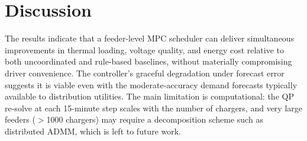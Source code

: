 \section{Discussion}
The results indicate that a feeder-level MPC scheduler can deliver simultaneous improvements
in thermal loading, voltage quality, and energy cost relative to both uncoordinated and
rule-based baselines, without materially compromising driver convenience. The controller's
graceful degradation under forecast error suggests it is viable even with the moderate-accuracy
demand forecasts typically available to distribution utilities. The main limitation is
computational: the QP re-solve at each 15-minute step scales with the number of chargers, and
very large feeders (\(>\)1000 chargers) may require a decomposition scheme such as distributed
ADMM, which is left to future work.

